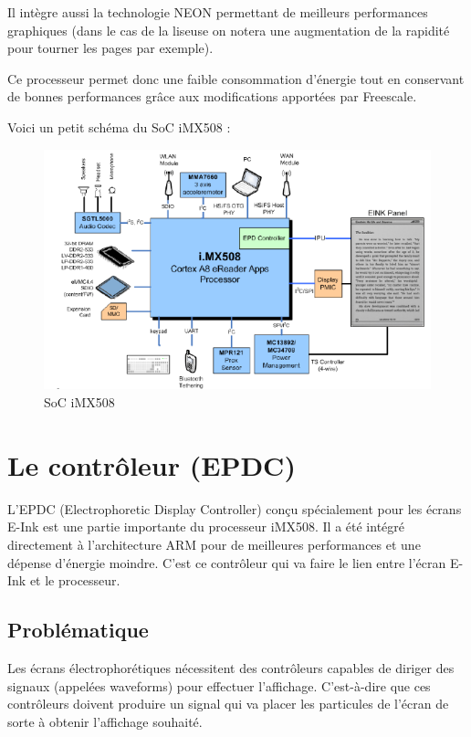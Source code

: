 Il intègre aussi la technologie NEON permettant de meilleurs performances graphiques (dans le cas de la liseuse on notera une augmentation de la rapidité pour tourner les pages par exemple).

Ce processeur permet donc une faible consommation d’énergie tout en conservant de bonnes performances grâce aux modifications apportées par Freescale.


Voici un petit schéma du SoC iMX508 :

\begin{figure}[h!]
\begin{center}
	\includegraphics{iMX508.png}
	\caption{SoC iMX508}
\end{center}
\end{figure}

\newpage

\section{Le contrôleur (EPDC)}

L'EPDC (Electrophoretic Display Controller) conçu spécialement pour les écrans E-Ink est une partie importante du processeur iMX508. Il a été intégré directement à l'architecture ARM pour de meilleures performances et une dépense d'énergie moindre. C'est ce contrôleur qui va faire le lien entre l'écran E-Ink et le processeur.

\subsection{Problématique}

Les écrans électrophorétiques nécessitent des contrôleurs capables de diriger des signaux (appelées waveforms) pour effectuer l'affichage. C'est-à-dire que ces contrôleurs doivent produire un signal qui va placer les particules de l'écran de sorte à obtenir l'affichage souhaité.

